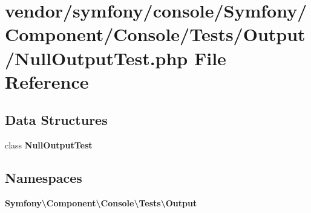 \section{vendor/symfony/console/\+Symfony/\+Component/\+Console/\+Tests/\+Output/\+Null\+Output\+Test.php File Reference}
\label{_null_output_test_8php}
\subsection*{Data Structures}
\begin{DoxyCompactItemize}
\item 
class {\bf Null\+Output\+Test}
\end{DoxyCompactItemize}
\subsection*{Namespaces}
\begin{DoxyCompactItemize}
\item 
 {\bf Symfony\textbackslash{}\+Component\textbackslash{}\+Console\textbackslash{}\+Tests\textbackslash{}\+Output}
\end{DoxyCompactItemize}
